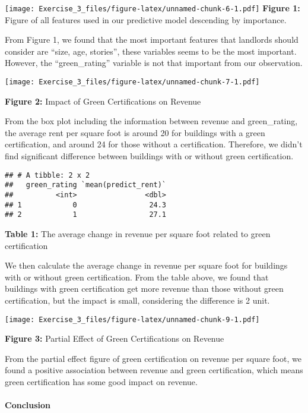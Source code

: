 \documentclass[
]{article}
\begin{document}
\texttt{[image: Exercise\_3\_files/figure-latex/unnamed-chunk-6-1.pdf]}
\textbf{Figure 1:} Figure of all features used in our predictive model
descending by importance.

From Figure 1, we found that the most important features that landlords
should consider are ``size, age, stories'', these variables seems to be
the most important. However, the ``green\_rating'' variable is not that
important from our observation.

\texttt{[image: Exercise\_3\_files/figure-latex/unnamed-chunk-7-1.pdf]}

\textbf{Figure 2:} Impact of Green Certifications on Revenue

From the box plot including the information between revenue and
green\_rating, the average rent per square foot is around 20 for
buildings with a green certification, and around 24 for those without a
certification. Therefore, we didn't find significant difference between
buildings with or without green certification.

\begin{verbatim}
## # A tibble: 2 x 2
##   green_rating `mean(predict_rent)`
##          <int>                <dbl>
## 1            0                 24.3
## 2            1                 27.1
\end{verbatim}

\textbf{Table 1:} The average change in revenue per square foot related
to green certification

We then calculate the average change in revenue per square foot for
buildings with or without green certification. From the table above, we
found that buildings with green certification get more revenue than
those without green certification, but the impact is small, considering
the difference is 2 unit.

\texttt{[image: Exercise\_3\_files/figure-latex/unnamed-chunk-9-1.pdf]}

\textbf{Figure 3:} Partial Effect of Green Certifications on Revenue

From the partial effect figure of green certification on revenue per
square foot, we found a positive association between revenue and green
certification, which means green certification has some good impact on
revenue.

\hypertarget{conclusion}{%
\paragraph{Conclusion}\label{conclusion}}
\end{document}
